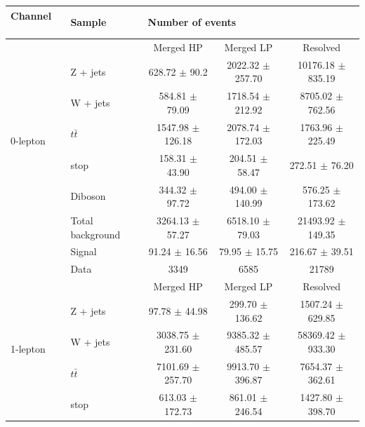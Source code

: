 \begin{table}[htbp]
\begin{center}
\begin{tabular}{| l | l | c | c | c |} \hline
Channel          　& Sample        & \multicolumn{3}{|l|}{Number of events} \\ \hline \hline
\multirow{7}{*}{0-lepton} &               & Merged HP  & Merged LP  & Resolved  \\ \cline{2-5}
                   & Z + jets     & 628.72 $\pm$ 90.2           & 2022.32 $\pm$ 257.70           & 10176.18 $\pm$ 835.19\\ 
                   & W + jets     & 584.81 $\pm$ 79.09           & 1718.54 $\pm$ 212.92           & 8705.02 $\pm$ 762.56\\  
                   & $t\bar{t}$   & 1547.98 $\pm$ 126.18           &  2078.74 $\pm$ 172.03          & 1763.96 $\pm$ 225.49\\ 
                   & stop         & 158.31 $\pm$ 43.90           &   204.51 $\pm$ 58.47         & 272.51 $\pm$ 76.20  \\ 
                   & Diboson      &  344.32 $\pm$ 97.72           &  494.00 $\pm$ 140.99          & 576.25 $\pm$ 173.62\\ \cline{2-5}
                   & Total background    & 3264.13 $\pm$ 57.27           &  6518.10 $\pm$ 79.03          &21493.92 $\pm$ 149.35\\ \cline{2-5}
                   & Signal       & 91.24 $\pm$ 16.56           &   79.95 $\pm$ 15.75         & 216.67 $\pm$ 39.51\\ \cline{2-5}
                   & Data         & 3349           & 6585           &21789\\ \hline \hline
\multirow{7}{*}{1-lepton} &               & Merged HP  & Merged LP  & Resolved  \\ \cline{2-5}
                   & Z + jets     & 97.78 $\pm$ 44.98           & 299.70 $\pm$ 136.62           &1507.24 $\pm$ 629.85\\ 
                   & W + jets     & 3038.75 $\pm$ 231.60           &  9385.32 $\pm$ 485.57          &58369.42 $\pm$ 933.30\\  
                   & $t\bar{t}$   & 7101.69 $\pm$ 257.70           &  9913.70 $\pm$ 396.87          &7654.37 $\pm$ 362.61\\ 
                   & stop         & 613.03 $\pm$ 172.73           &  861.01 $\pm$ 246.54          & 1427.80 $\pm$ 398.70\\ 

\end{tabular}
\end{center}
\end{table}
